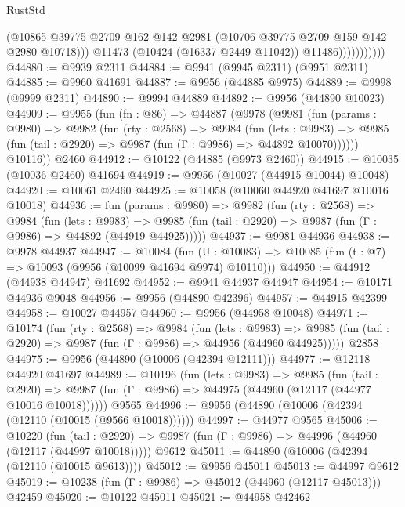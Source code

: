 \begin{lexlean}{RustStd}
\begin{coremodule}
                            (@10865
                              @39775
                              @2709
                              @162
                              @142
                              @2981
                              (@10706 @39775 @2709 @159 @142 @2980 @10718)))
                          @11473
                          (@10424 (@16337 @2449 @11042))
                          @11486)))))))))))
@44880 := @9939 @2311
@44884 := @9941 (@9945 @2311) (@9951 @2311)
@44885 := @9960 @41691
@44887 := @9956 (@44885 @9975)
@44889 := @9998 (@9999 @2311)
@44890 := @9994 @44889
@44892 := @9956 (@44890 @10023)
@44909 := @9955
    (fun (fn : @86) =>
    @44887
      (@9978
        (@9981
          (fun (params : @9980) =>
          @9982
            (fun (rty : @2568) =>
            @9984
              (fun (lets : @9983) =>
              @9985 (fun (tail : @2920) => @9987 (fun (Γ : @9986) => @44892 @10070))))))
        @10116))
    @2460
@44912 := @10122 (@44885 (@9973 @2460))
@44915 := @10035 (@10036 @2460) @41694
@44919 := @9956 (@10027 (@44915 @10044) @10048)
@44920 := @10061 @2460
@44925 := @10058 (@10060 @44920 @41697 @10016 @10018)
@44936 := fun (params : @9980) =>
  @9982
    (fun (rty : @2568) =>
    @9984
      (fun (lets : @9983) =>
      @9985 (fun (tail : @2920) => @9987 (fun (Γ : @9986) => @44892 (@44919 @44925)))))
@44937 := @9981 @44936
@44938 := @9978 @44937
@44947 := @10084
    (fun (U : @10083) => @10085 (fun (t : @7) => @10093 (@9956 (@10099 @41694 @9974) @10110)))
@44950 := @44912 (@44938 @44947) @41692
@44952 := @9941 @44937 @44947
@44954 := @10171 @44936 @9048
@44956 := @9956 (@44890 @42396)
@44957 := @44915 @42399
@44958 := @10027 @44957
@44960 := @9956 (@44958 @10048)
@44971 := @10174
    (fun (rty : @2568) =>
    @9984
      (fun (lets : @9983) =>
      @9985 (fun (tail : @2920) => @9987 (fun (Γ : @9986) => @44956 (@44960 @44925)))))
    @2858
@44975 := @9956 (@44890 (@10006 (@42394 @12111)))
@44977 := @12118 @44920 @41697
@44989 := @10196
    (fun (lets : @9983) =>
    @9985
      (fun (tail : @2920) =>
      @9987 (fun (Γ : @9986) => @44975 (@44960 (@12117 (@44977 @10016 @10018))))))
    @9565
@44996 := @9956 (@44890 (@10006 (@42394 (@12110 (@10015 (@9566 @10018))))))
@44997 := @44977 @9565
@45006 := @10220
    (fun (tail : @2920) => @9987 (fun (Γ : @9986) => @44996 (@44960 (@12117 (@44997 @10018)))))
    @9612
@45011 := @44890 (@10006 (@42394 (@12110 (@10015 @9613))))
@45012 := @9956 @45011
@45013 := @44997 @9612
@45019 := @10238 (fun (Γ : @9986) => @45012 (@44960 (@12117 @45013))) @42459
@45020 := @10122 @45011
@45021 := @44958 @42462

\end{coremodule}
\end{lexlean}
